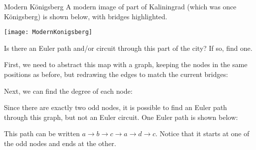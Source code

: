 \begin{example}[https://www.youtube.com/watch?v=b7GYc7zb5ec&list=PLfmpjsIzhztst_PxJXo574wshSwxU9Yg_&index=3]{Modern K\"onigsberg}
A modern image of part of Kaliningrad (which was once K\"onigsberg) is shown below, with bridges highlighted.
\begin{center}
\texttt{[image: ModernKonigsberg]}
\end{center}
Is there an Euler path and/or circuit through this part of the city?  If so, find one.

\sol
First, we need to abstract this map with a graph, keeping the nodes in the same positions as before, but redrawing the edges to match the current bridges:
\begin{center}
\end{center}

Next, we can find the degree of each node:
\begin{center}
\end{center}

Since there are exactly two odd nodes, it is possible to find an Euler path through this graph, but not an Euler circuit.  One Euler path is shown below:
\begin{center}
\end{center}
This path can be written $\boxed{a \to b \to c \to a \to d \to c}$.  Notice that it starts at one of the odd nodes and ends at the other.
\end{example}
\pagebreak

